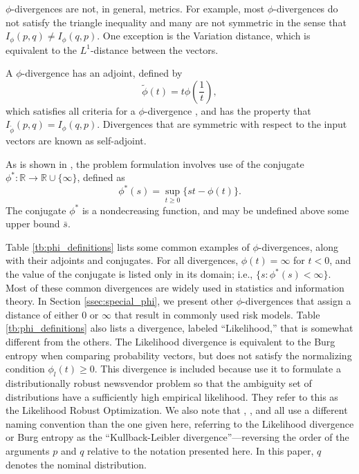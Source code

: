 \documentclass[ijoc,letterpaper]{informs3} %
\newcommand{\R}{{\mathbb{R}}}
\begin{document}
$\phi$-divergences are not, in general, metrics.
For example, most $\phi$-divergences do not satisfy the triangle inequality and many are not symmetric in the sense that $I_\phi(p,q) \neq I_\phi(q,p)$.
One exception is the Variation distance, which is equivalent to the $L^1$-distance between the vectors.

A $\phi$-divergence has an adjoint, defined by
\begin{equation} \label{eq:adjoint}
	\tilde{\phi}(t) = t \phi\left(\frac{1}{t}\right),
\end{equation}
which satisfies all criteria for a $\phi$-divergence \citep{bental1991certainty}, and has the property that $I_{\tilde{\phi}}(p,q) = I_\phi(q,p)$.
Divergences that are symmetric with respect to the input vectors are known as self-adjoint.

As is shown in \citep{bental2011robust}, the problem formulation involves use of the conjugate $\phi^* : \R \rightarrow \R \cup \{\infty\}$, defined as
\begin{equation} \label{eq:conjugate}
	\phi^*(s) = \sup_{t \geq 0} \{st - \phi(t)\}.
\end{equation}
The conjugate $\phi^*$ is a nondecreasing function, and may be undefined above some upper bound $\bar{s}$.

Table \ref{tb:phi_definitions} lists some common examples of $\phi$-divergences, along with their adjoints and conjugates.
For all divergences, $\phi(t) = \infty$ for $t < 0$, and the value of the conjugate is listed only in its domain; i.e., $\{s : \phi^*(s) < \infty\}$.
Most of these common divergences are widely used in statistics and information theory.
In Section \ref{ssec:special_phi}, we present other $\phi$-divergences that assign a distance of either $0$ or $\infty$ that result in commonly used risk models.
Table \ref{tb:phi_definitions} also lists a divergence, labeled ``Likelihood,'' that is somewhat different from the others.
The Likelihood divergence is equivalent to the Burg entropy when comparing probability vectors, but does not satisfy the normalizing condition $\phi_l(t) \geq 0$.
This divergence is included because \cite{wang2010likelihood} use it to formulate a distributionally robust newsvendor problem so that the ambiguity set of distributions have a sufficiently high empirical likelihood. 
They refer to this as the Likelihood Robust Optimization. 
We also note that \cite{calafiore2007ambiguous}, \cite{hukullback}, and \cite{wang2010likelihood} all use a different naming convention than the one given here, referring to the Likelihood divergence or Burg entropy as the ``Kullback-Leibler divergence''---reversing the order of the arguments $p$ and $q$ relative to the notation presented here.
In this paper, $q$ denotes the nominal distribution. 
\end{document}
